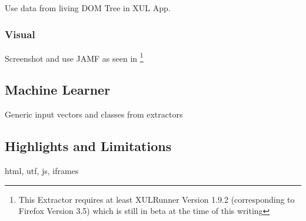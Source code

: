Use data from living DOM Tree in XUL App.

\subsubsection{Visual}

Screenshot and use JAMF as seen in \cite{Steger08}
\footnote{This Extractor requires at least XULRunner Version 1.9.2 (corresponding to Firefox Version 3.5) which is still in beta at the time of this writing}

\subsection{Machine Learner}

Generic input vectors and classes from extractors

\subsection{\label{sec:limitations}Highlights and Limitations}

html, utf, js, iframes

